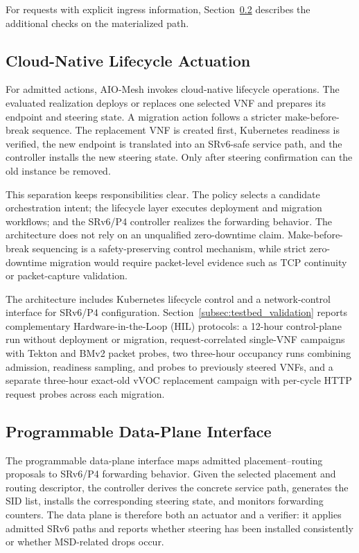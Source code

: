 \documentclass[final,5p]{elsarticle}
\newcommand{\rev}[1]{\textcolor{revisiongreen}{#1}}
\let\newrev\rev
\begin{document}
\newrev{For requests with explicit ingress information, Section~\ref{subsec:data_plane_interface} describes the additional checks on the materialized path.}

\subsection{Cloud-Native Lifecycle Actuation}
\label{subsec:cloud_native_actuation}

For admitted actions, AIO-Mesh invokes cloud-native lifecycle operations. \newrev{The evaluated realization deploys or replaces one selected VNF and prepares its endpoint and steering state.} A migration action follows a stricter make-before-break sequence. The replacement VNF is created first, Kubernetes readiness is verified, the new endpoint is translated into an SRv6-safe service path, and the controller installs the new steering state. Only after steering confirmation can the old instance be removed.

This separation keeps responsibilities clear. The policy selects a \newrev{candidate} orchestration intent; the lifecycle layer executes deployment and migration workflows; and the SRv6/P4 controller realizes the forwarding behavior. The architecture does not rely on an unqualified zero-downtime claim. Make-before-break sequencing is a safety-preserving control mechanism, while strict zero-downtime migration would require packet-level evidence such as TCP continuity or packet-capture validation.

\newrev{The architecture includes Kubernetes lifecycle control and a network-control interface for SRv6/P4 configuration. Section~\ref{subsec:testbed_validation} reports complementary Hardware-in-the-Loop (HIL) protocols: a 12-hour control-plane run without deployment or migration, request-correlated single-VNF campaigns with Tekton and BMv2 packet probes, two three-hour occupancy runs combining admission, readiness sampling, and probes to previously steered VNFs, and a separate three-hour exact-old vVOC replacement campaign with per-cycle HTTP request probes across each migration.}

\subsection{Programmable Data-Plane Interface}
\label{subsec:data_plane_interface}

The programmable data-plane interface maps \newrev{admitted placement--routing proposals} to SRv6/P4 forwarding behavior. Given the selected placement and routing descriptor, the controller derives the concrete service path, generates the SID list, installs the corresponding steering state, and monitors forwarding counters. The data plane is therefore both an actuator and a verifier: it applies admitted SRv6 paths and reports whether steering has been installed consistently or whether MSD-related drops occur.
\end{document}
